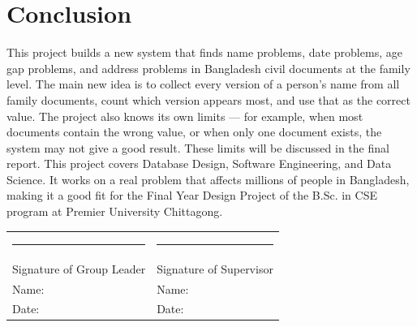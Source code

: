 \documentclass[12pt, a4paper]{article}
\begin{document}
\section{Conclusion}

This project builds a new system that finds name problems, date problems,
age gap problems, and address problems in Bangladesh civil documents at the
family level. The main new idea is to collect every version of a person's
name from all family documents, count which version appears most, and use
that as the correct value. The project also knows its own limits --- for
example, when most documents contain the wrong value, or when only one
document exists, the system may not give a good result. These limits will
be discussed in the final report. This project covers Database Design,
Software Engineering, and Data Science. It works on a real problem that
affects millions of people in Bangladesh, making it a good fit for the
Final Year Design Project of the B.Sc. in CSE program at Premier University
Chittagong.

\vspace{2cm}

\noindent
\begin{tabular}{p{5cm} p{5cm}}
    \rule{4cm}{0.5pt} & \rule{4cm}{0.5pt} \\
    Signature of Group Leader & Signature of Supervisor \\[0.3cm]
    Name: \underline{\hspace{3cm}} & Name: \underline{\hspace{3cm}} \\
    Date: \underline{\hspace{3cm}} & Date: \underline{\hspace{3cm}} \\
\end{tabular}
\end{document}
